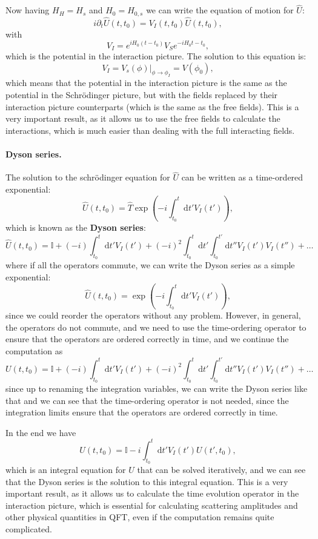 Now having \(H_H = H_s\) and \(H_0 = H_{0,s}\)  we can write the equation of motion for \(\hat{U}\):
\[
    i \partial_t \hat{U}(t,t_0) = V_I (t,t_0) \hat{U}(t,t_0),
\]
with
\[
    V_I = e^{i H_0 (t-t_0)} V_S e^{-i H_0 t-t_0},
\]
which is the potential in the interaction picture. The solution to this equation is:
\[
    V_I = V_s(\phi) \big|_{\phi \to \phi_I} = V(\phi_0),
\]
which means that the potential in the interaction picture is the same as the potential in the Schrödinger picture, but with the fields replaced by their interaction picture counterparts (which is the same as the free fields). This is a very important result, as it allows us to use the free fields to calculate the interactions, which is much easier than dealing with the full interacting fields.

\paragraph{Dyson series.}
The solution to the schrödinger equation for \(\hat{U}\) can be written as a time-ordered exponential:
\[
    \hat{U}(t,t_0) = \hat{T} \exp \left( -i \int_{t_0}^t \mathrm{d} t' V_I (t') \right),
\]
which is known as the \textbf{Dyson series}:
\[
    \hat{U}(t,t_0) = \mathbb{I} + (-i) \int_{t_0}^t \mathrm{d} t' V_I (t') + (-i)^2 \int_{t_0}^t \mathrm{d} t' \int_{t_0}^{t'} \mathrm{d} t'' V_I (t') V_I (t'') + \dots
\]
where if all the operators commute, we can write the Dyson series as a simple exponential:
\[
    \hat{U}(t,t_0) = \exp \left( -i \int_{t_0}^t \mathrm{d} t' V_I (t') \right),
\]
since we could reorder the operators without any problem. However, in general, the operators do not commute, and we need to use the time-ordering operator to ensure that the operators are ordered correctly in time, and we continue the computation as
\[
    U(t,t_0) = \mathbb{I} + (-i) \int_{t_0}^t \mathrm{d} t' V_I (t') + (-i)^2 \int_{t_0}^t \mathrm{d} t' \int_{t_0}^{t'} \mathrm{d} t'' V_I (t') V_I (t'') + \dots
\]
since up to renaming the integration variables, we can write the Dyson series like that and we can see that the time-ordering operator is not needed, since the integration limits ensure that the operators are ordered correctly in time.

In the end we have
\[
    U(t,t_0) = \mathbb{I} -i \int_{t_0}^t \mathrm{d} t' V_I (t') U(t',t_0),
\]
which is an integral equation for \(U\) that can be solved iteratively, and we can see that the Dyson series is the solution to this integral equation. This is a very important result, as it allows us to calculate the time evolution operator in the interaction picture, which is essential for calculating scattering amplitudes and other physical quantities in QFT, even if the computation remains quite complicated.

